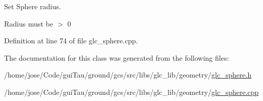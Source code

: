 Set Sphere radius. 

Radius must be $>$ 0 

Definition at line 74 of file glc\-\_\-sphere.\-cpp.



The documentation for this class was generated from the following files\-:\begin{DoxyCompactItemize}
\item 
/home/jose/\-Code/gui\-Tau/ground/gcs/src/libs/glc\-\_\-lib/geometry/\hyperlink{glc__sphere_8h}{glc\-\_\-sphere.\-h}\item 
/home/jose/\-Code/gui\-Tau/ground/gcs/src/libs/glc\-\_\-lib/geometry/\hyperlink{glc__sphere_8cpp}{glc\-\_\-sphere.\-cpp}\end{DoxyCompactItemize}
